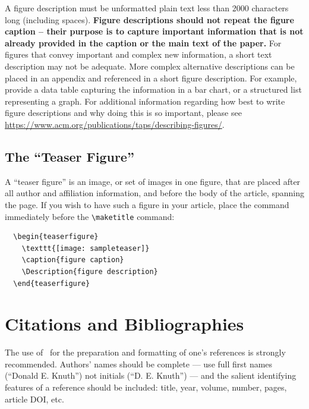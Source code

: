 \documentclass[
  letterpaper,
  DIV=11,
  numbers=noendperiod]{scrartcl}
\begin{document}
A figure description must be unformatted plain text less than 2000
characters long (including spaces). \textbf{Figure descriptions should
not repeat the figure caption -- their purpose is to capture important
information that is not already provided in the caption or the main text
of the paper.} For figures that convey important and complex new
information, a short text description may not be adequate. More complex
alternative descriptions can be placed in an appendix and referenced in
a short figure description. For example, provide a data table capturing
the information in a bar chart, or a structured list representing a
graph. For additional information regarding how best to write figure
descriptions and why doing this is so important, please see
\url{https://www.acm.org/publications/taps/describing-figures/}.

\hypertarget{the-teaser-figure}{%
\subsection{The ``Teaser Figure''}\label{the-teaser-figure}}

A ``teaser figure'' is an image, or set of images in one figure, that
are placed after all author and affiliation information, and before the
body of the article, spanning the page. If you wish to have such a
figure in your article, place the command immediately before the
\texttt{\textbackslash{}maketitle} command:

\begin{verbatim}
  \begin{teaserfigure}
    \texttt{[image: sampleteaser]}
    \caption{figure caption}
    \Description{figure description}
  \end{teaserfigure}
\end{verbatim}

\hypertarget{citations-and-bibliographies}{%
\section{Citations and
Bibliographies}\label{citations-and-bibliographies}}

The use of \BibTeX~for the preparation and formatting of one's
references is strongly recommended. Authors' names should be complete
--- use full first names (``Donald E. Knuth'') not initials (``D. E.
Knuth'') --- and the salient identifying features of a reference should
be included: title, year, volume, number, pages, article DOI, etc.
\end{document}
